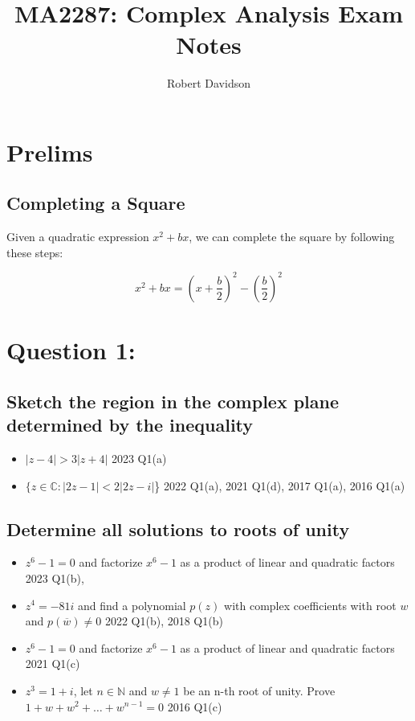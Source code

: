 \documentclass[a4paper, 8pt]{extarticle}
\title{
\textbf{MA2287: Complex Analysis Exam Notes} \\ 
}
\author{
  Robert Davidson
}
\date{} %
\begin{document}
\maketitle
\pagebreak
\tableofcontents
\pagebreak

\section*{Prelims}
\subsection*{Completing a Square}
\begin{definitionbox}
    Given a quadratic expression $x^2 + bx$, we can complete the square by following these steps:

    $$x^2 + bx = \left(x + \frac{b}{2}\right)^2 - \left(\frac{b}{2}\right)^2$$
\end{definitionbox}


\section{Question 1: }
\subsection{Sketch the region in the complex plane determined by the inequality}
\begin{itemize}
    \item $|z - 4| > 3|z+4|$ \hfill 2023 Q1(a)
    \item $\{ z \in \mathbb{C} : |2z - 1| < 2|2z-i|$\} \hfill  2022 Q1(a), 2021 Q1(d), 2017 Q1(a), 2016 Q1(a)
\end{itemize}
\subsection{Determine all solutions to roots of unity}
\begin{itemize}
    \item $z^6 -1 = 0$ and factorize $x^6 -1$ as a product of linear and quadratic factors \hfill 2023 Q1(b),
    \item $z^4 = -81i$ and find a polynomial $p(z)$ with complex coefficients with root $w$ and $p(\overline{w}) \neq 0$ \hfill 2022 Q1(b), 2018 Q1(b)
    \item $z^6 -1 = 0$ and factorize $x^6 -1$ as a product of linear and quadratic factors \hfill 2021 Q1(c)
    \item $z^3 = 1+i$, let $n \in \mathbb{N}$ and $w \neq 1$ be an n-th root of unity. Prove $1 + w + w^2 + \ldots + w^{n-1} = 0$ \hfill 2016 Q1(c)
\end{itemize}
\end{document}
